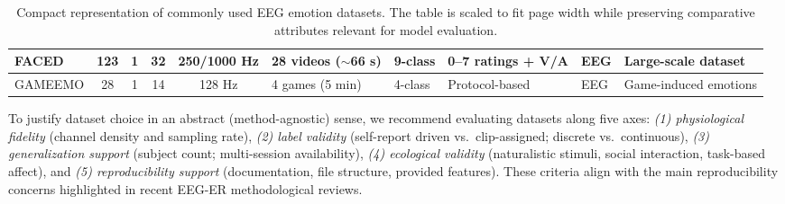 \documentclass{WileyMSP-template}
\begin{document}
\begin{table}[t]
{\begin{tabular}{|p{1.45cm}|c|c|c|c|p{2.2cm}|p{1.9cm}|p{1.9cm}|p{1.9cm}|p{2.6cm}|}
\hline
FACED \cite{chen2023faced} & 123 & 1 & 32 & 250/1000 Hz & 28 videos ($\sim$66 s) & 9-class & 0--7 ratings + V/A & EEG & Large-scale dataset \\

\hline
GAMEEMO \cite{alakus2021gameemo} & 28 & 1 & 14 & 128 Hz & 4 games (5 min) & 4-class & Protocol-based & EEG & Game-induced emotions \\

\hline
\end{tabular}
}

\caption{Compact representation of commonly used EEG emotion datasets. The table is scaled to fit page width while preserving comparative attributes relevant for model evaluation.}
\label{tab:dataset_attr}
\end{table}

To justify dataset choice in an abstract (method-agnostic) sense, we recommend evaluating datasets along five axes:
\textit{(1) physiological fidelity} (channel density and sampling rate),
\textit{(2) label validity} (self-report driven vs.\ clip-assigned; discrete vs.\ continuous),
\textit{(3) generalization support} (subject count; multi-session availability),
\textit{(4) ecological validity} (naturalistic stimuli, social interaction, task-based affect),
and \textit{(5) reproducibility support} (documentation, file structure, provided features).
These criteria align with the main reproducibility concerns highlighted in recent EEG-ER methodological reviews. \cite{li2022tutorial,kukhilava2025evaluation,brookshire2024leakage}
\end{document}
